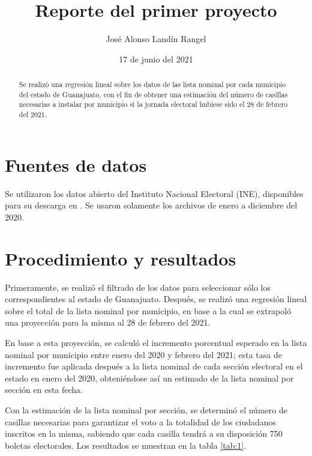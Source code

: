 \documentclass[twocolumn]{article}
\title{\textbf{Reporte del primer proyecto}}
\author{José Alonso Landín Rangel}
\date{17 de junio del 2021}
\begin{document}
\maketitle

\begin{abstract}
    Se realizó una regresión lineal sobre los datos de las lista nominal por cada municipio del estado de Guanajuato, con el fin de obtener una estimación del número de casillas necesarias a instalar por municipio si la jornada electoral hubiese sido el 28 de febrero del 2021.
\end{abstract}

\section{Fuentes de datos}

Se utilizaron los datos abierto del Instituto Nacional Electoral (INE), disponibles para su descarga en \cite{INE}. Se usaron solamente los archivos de enero a diciembre del 2020.

\medskip

\section{Procedimiento y resultados}


Primeramente, se realizó el filtrado de los datos para seleccionar sólo los correspondientes al estado de Guanajuato. Después, se realizó una regresión lineal sobre el total de la lista nominal por municipio, en base a la cual se extrapoló una proyección para la misma al 28 de febrero del 2021.

\medskip

En base a esta proyección, se calculó el incremento porcentual esperado en la lista nominal por municipio
entre enero del 2020 y febrero del 2021; esta tasa 
de incremento fue aplicada después a la lista nominal de cada sección electoral en el estado en 
enero del 2020, obteniéndose así un estimado de la lista nominal por sección en esta fecha.

\medskip

Con la estimación de la lista nominal por sección, se determinó el número de casillas 
necesarias para garantizar el voto a la totalidad de los ciudadanos inscritos en la misma, 
sabiendo que cada casilla tendrá a su disposición 750 boletas electorales. Los resultados se muestran en la tabla \ref{tab:1}.
\end{document}
